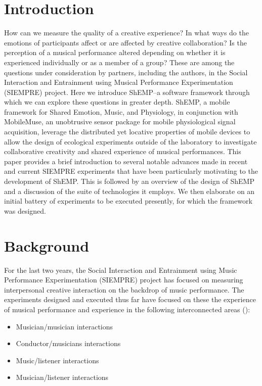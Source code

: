 \documentclass{sig-alternate}
\begin{document}
\section{Introduction}
How can we measure the quality of a creative experience?  In what ways do the emotions of participants affect or are affected by creative collaboration?  Is the perception of a musical performance altered depending on whether it is experienced individually or as a member of a group?  These are among the questions under consideration by partners, including the authors, in the Social Interaction and Entrainment using Musical Performance Experimentation (SIEMPRE) project.  Here we introduce ShEMP--a software framework through which we can explore these questions in greater depth.  ShEMP, a mobile framework for Shared Emotion, Music, and Physiology, in conjunction with MobileMuse, an unobtrusive sensor package for mobile physiological signal acquisition, leverage the distributed yet locative properties of mobile devices to allow the design of ecological experiments outside of the laboratory to investigate collaborative creativity and shared experience of musical performances.  This paper provides a brief introduction to several notable advances made in recent and current SIEMPRE experiments that have been particularly motivating to the development of ShEMP.  This is followed by an overview of the design of ShEMP and a discussion of the suite of technologies it employs.  We then elaborate on an initial battery of experiments to be executed presently, for which the framework was designed.

\section{Background}
For the last two years, the Social Interaction and Entrainment using Music Performance Experimentation (SIEMPRE) project has focused on measuring interpersonal creative interaction on the backdrop of music performance.  The experiments designed and executed thus far have focused on these the experience of musical performance and experience in the following interconnected areas (\cite{SIEMPREProjectConsortium:2011vh}):

\begin{itemize}
	\item Musician/musician interactions
	\item Conductor/musicians interactions
	\item Music/listener interactions
	\item Musician/listener interactions
\end{itemize}
\end{document}
